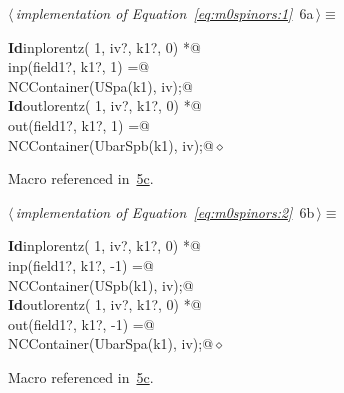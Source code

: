 \documentclass[a4paper,12pt]{amsart}
\renewcommand{\NWtarget}[2]{\hypertarget{#1}{#2}}
\renewcommand{\NWlink}[2]{\hyperlink{#1}{#2}}
\renewcommand{\NWtxtMacroRefIn}{Macro referenced in}
\renewcommand{\NWsep}{${\diamond}$}
\begin{document}
\begin{flushleft} \small
\begin{minipage}{\linewidth}\label{scrap9}\raggedright\small
\NWtarget{nuweb6a}{} $\langle\,${\itshape implementation of Equation~\eqref{eq:m0spinors:1}}\nobreak\ {\footnotesize {6a}}$\,\rangle\equiv$
\vspace{-1ex}
\begin{list}{}{} \item
\mbox{}\verb@@\hbox{\sffamily\bfseries Id}\verb@ inplorentz( 1, iv?, k1?, 0) *@\\
\mbox{}\verb@      inp(field1?, k1?,  1) =@\\
\mbox{}\verb@   NCContainer(USpa(k1), iv);@\\
\mbox{}\verb@@\hbox{\sffamily\bfseries Id}\verb@ outlorentz( 1, iv?, k1?, 0) *@\\
\mbox{}\verb@      out(field1?, k1?,  1) =@\\
\mbox{}\verb@   NCContainer(UbarSpb(k1), iv);@{\NWsep}
\end{list}
\vspace{-1.5ex}
\footnotesize
\begin{list}{}{\setlength{\itemsep}{-\parsep}\setlength{\itemindent}{-\leftmargin}}
\item \NWtxtMacroRefIn\ \NWlink{nuweb5c}{5c}.

\item{}
\end{list}
\end{minipage}\vspace{4ex}
\end{flushleft}
\begin{flushleft} \small
\begin{minipage}{\linewidth}\label{scrap10}\raggedright\small
\NWtarget{nuweb6b}{} $\langle\,${\itshape implementation of Equation~\eqref{eq:m0spinors:2}}\nobreak\ {\footnotesize {6b}}$\,\rangle\equiv$
\vspace{-1ex}
\begin{list}{}{} \item
\mbox{}\verb@@\hbox{\sffamily\bfseries Id}\verb@ inplorentz( 1, iv?, k1?, 0) *@\\
\mbox{}\verb@      inp(field1?, k1?, -1) =@\\
\mbox{}\verb@   NCContainer(USpb(k1), iv);@\\
\mbox{}\verb@@\hbox{\sffamily\bfseries Id}\verb@ outlorentz( 1, iv?, k1?, 0) *@\\
\mbox{}\verb@      out(field1?, k1?, -1) =@\\
\mbox{}\verb@   NCContainer(UbarSpa(k1), iv);@{\NWsep}
\end{list}
\vspace{-1.5ex}
\footnotesize
\begin{list}{}{\setlength{\itemsep}{-\parsep}\setlength{\itemindent}{-\leftmargin}}
\item \NWtxtMacroRefIn\ \NWlink{nuweb5c}{5c}.

\item{}
\end{list}
\end{minipage}\vspace{4ex}
\end{flushleft}
\end{document}
